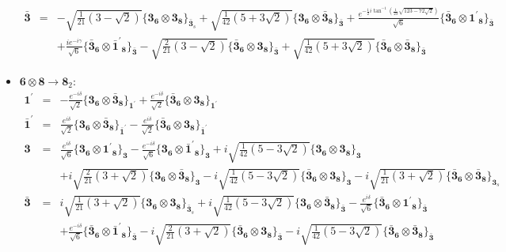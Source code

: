\documentclass[english]{article}
\newcommand{\subcg}[3]{\big\{ {#1}\otimes{#2}\big\}^{}_{#3}}
\newcommand{\rep}[1]{\mathbf{#1}}
\begin{document}
\begin{itemize}
\begin{eqnarray*}
\rep{\bar{3}} &=& -\sqrt{\frac{1}{21} \left(3-\sqrt{2}\right)}\subcg{\rep{3}_{\rep{6}}}{\rep{3}_{\rep{8}}}{\rep{\bar{3}}_{s}}+\sqrt{\frac{1}{42} \left(5+3 \sqrt{2}\right)}\subcg{\rep{3}_{\rep{6}}}{\rep{\bar{3}}_{\rep{8}}}{\rep{\bar{3}}}+\frac{e^{-\frac{1}{2} i \tan ^{-1}\left(\frac{1}{23} \sqrt{123-72 \sqrt{2}}\right)}}{\sqrt{6}}\subcg{\rep{\bar{3}}_{\rep{6}}}{\rep{1^{\prime}}_{\rep{8}}}{\rep{\bar{3}}} \\ 
 & & +\frac{i e^{-i \gamma }}{\sqrt{6}}\subcg{\rep{\bar{3}}_{\rep{6}}}{\rep{\bar{1}^{\prime}}_{\rep{8}}}{\rep{\bar{3}}}-\sqrt{\frac{2}{21} \left(3-\sqrt{2}\right)}\subcg{\rep{\bar{3}}_{\rep{6}}}{\rep{3}_{\rep{8}}}{\rep{\bar{3}}}+\sqrt{\frac{1}{42} \left(5+3 \sqrt{2}\right)}\subcg{\rep{\bar{3}}_{\rep{6}}}{\rep{\bar{3}}_{\rep{8}}}{\rep{\bar{3}}}
\end{eqnarray*}
\item $\rep{6}\otimes\rep{8}\to\rep{8}_{2}$:
\begin{eqnarray*}
\rep{1^{\prime}} &=& -\frac{e^{-i \delta }}{\sqrt{2}}\subcg{\rep{3}_{\rep{6}}}{\rep{\bar{3}}_{\rep{8}}}{\rep{1^{\prime}}}+\frac{e^{-i \delta }}{\sqrt{2}}\subcg{\rep{\bar{3}}_{\rep{6}}}{\rep{3}_{\rep{8}}}{\rep{1^{\prime}}}
\\
\rep{\bar{1}^{\prime}} &=& \frac{e^{i \delta }}{\sqrt{2}}\subcg{\rep{3}_{\rep{6}}}{\rep{\bar{3}}_{\rep{8}}}{\rep{\bar{1}^{\prime}}}-\frac{e^{i \delta }}{\sqrt{2}}\subcg{\rep{\bar{3}}_{\rep{6}}}{\rep{3}_{\rep{8}}}{\rep{\bar{1}^{\prime}}}
\\
\rep{3} &=& \frac{e^{i \delta }}{\sqrt{6}}\subcg{\rep{3}_{\rep{6}}}{\rep{1^{\prime}}_{\rep{8}}}{\rep{3}}-\frac{e^{-i \delta }}{\sqrt{6}}\subcg{\rep{3}_{\rep{6}}}{\rep{\bar{1}^{\prime}}_{\rep{8}}}{\rep{3}}+i \sqrt{\frac{1}{42} \left(5-3 \sqrt{2}\right)}\subcg{\rep{3}_{\rep{6}}}{\rep{3}_{\rep{8}}}{\rep{3}} \\ 
 & & +i \sqrt{\frac{2}{21} \left(3+\sqrt{2}\right)}\subcg{\rep{3}_{\rep{6}}}{\rep{\bar{3}}_{\rep{8}}}{\rep{3}}-i \sqrt{\frac{1}{42} \left(5-3 \sqrt{2}\right)}\subcg{\rep{\bar{3}}_{\rep{6}}}{\rep{3}_{\rep{8}}}{\rep{3}}-i \sqrt{\frac{1}{21} \left(3+\sqrt{2}\right)}\subcg{\rep{\bar{3}}_{\rep{6}}}{\rep{\bar{3}}_{\rep{8}}}{\rep{3}_{s}}
\\
\rep{\bar{3}} &=& i \sqrt{\frac{1}{21} \left(3+\sqrt{2}\right)}\subcg{\rep{3}_{\rep{6}}}{\rep{3}_{\rep{8}}}{\rep{\bar{3}}_{s}}+i \sqrt{\frac{1}{42} \left(5-3 \sqrt{2}\right)}\subcg{\rep{3}_{\rep{6}}}{\rep{\bar{3}}_{\rep{8}}}{\rep{\bar{3}}}-\frac{e^{i \delta }}{\sqrt{6}}\subcg{\rep{\bar{3}}_{\rep{6}}}{\rep{1^{\prime}}_{\rep{8}}}{\rep{\bar{3}}} \\ 
 & & +\frac{e^{-i \delta }}{\sqrt{6}}\subcg{\rep{\bar{3}}_{\rep{6}}}{\rep{\bar{1}^{\prime}}_{\rep{8}}}{\rep{\bar{3}}}-i \sqrt{\frac{2}{21} \left(3+\sqrt{2}\right)}\subcg{\rep{\bar{3}}_{\rep{6}}}{\rep{3}_{\rep{8}}}{\rep{\bar{3}}}-i \sqrt{\frac{1}{42} \left(5-3 \sqrt{2}\right)}\subcg{\rep{\bar{3}}_{\rep{6}}}{\rep{\bar{3}}_{\rep{8}}}{\rep{\bar{3}}}
\end{eqnarray*}
\end{itemize}
\end{document}
